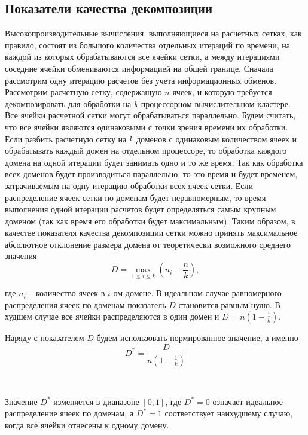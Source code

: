 \subsection{Показатели качества декомпозиции}

Высокопроизводительные вычисления, выполняющиеся на расчетных сетках, как правило, состоят из большого количества отдельных итераций по времени, на каждой из которых обрабатываются все ячейки сетки, а между итерациями соседние ячейки обмениваются информацией на общей границе.
Сначала рассмотрим одну итерацию расчетов без учета информационных обменов.
Рассмотрим расчетную сетку, содержащую $n$ ячеек, и которую требуется декомпозировать для обработки на $k$-процессорном вычислительном кластере.
Все ячейки расчетной сетки могут обрабатываться параллельно.
Будем считать, что все ячейки являются одинаковыми с точки зрения времени их обработки.
Если разбить расчетную сетку на $k$ доменов с одинаковым количеством ячеек и обрабатывать каждый домен на отдельном процессоре, то обработка каждого домена на одной итерации будет занимать одно и то же время.
Так как обработка всех доменов будет производиться параллельно, то это время и будет временем, затрачиваемым на одну итерацию обработки всех ячеек сетки.
Если распределение ячеек сетки по доменам будет неравномерным, то время выполнения одной итерации расчетов будет определяться самым крупным доменом (так как время его обработки будет максимальным).
Таким образом, в качестве показателя качества декомпозиции сетки можно принять максимальное абсолютное отклонение размера домена от теоретически возможного среднего значения
\begin{equation}
	D = \max_{1 \le i \le k}{ \left( n_i - \frac{n}{k} \right) },
\end{equation}
 
где $n_i$ – количество ячеек в $i$-ом домене.
В идеальном случае равномерного распределения ячеек по доменам показатель $D$ становится равным нулю.
В худшем случае все ячейки распределяются в один домен и $D = n \left( 1 - \frac{1}{k} \right)$.

Наряду с показателем $D$ будем использовать нормированное значение, а именно
\begin{equation}
	D^{*} = \frac{D}{n \left( 1 - \frac{1}{k} \right)}
\end{equation}

\

Значение $D^{*}$ изменяется в диапазоне $[0, 1]$, где $D^{*} = 0$ означает идеальное распределение ячеек по доменам, а $D^{*} = 1$ соответствует наихудшему случаю, когда все ячейки отнесены к одному домену.

